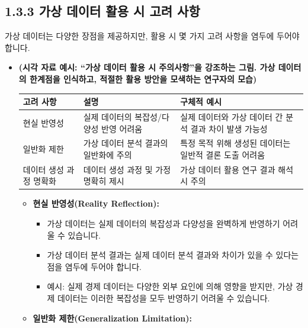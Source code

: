 \documentclass[
  letterpaper,
]{book}
\providecommand{\tightlist}{%
  \setlength{\itemsep}{0pt}\setlength{\parskip}{0pt}}
\begin{document}
\subsection{1.3.3 가상 데이터 활용 시 고려
사항}\label{uxac00uxc0c1-uxb370uxc774uxd130-uxd65cuxc6a9-uxc2dc-uxace0uxb824-uxc0acuxd56d}

가상 데이터는 다양한 장점을 제공하지만, 활용 시 몇 가지 고려 사항을
염두에 두어야 합니다.

\begin{itemize}
\item
  \textbf{(시각 자료 예시: ``가상 데이터 활용 시 주의사항''을 강조하는
  그림. 가상 데이터의 한계점을 인식하고, 적절한 활용 방안을 모색하는
  연구자의 모습)}

  \begin{longtable}[]{@{}
    >{\centering\arraybackslash}p{}
    >{\centering\arraybackslash}p{}
    >{\centering\arraybackslash}p{}@{}}
  \toprule\noalign{}
  \begin{minipage}[b]{\linewidth}\centering
  고려 사항
  \end{minipage} & \begin{minipage}[b]{\linewidth}\centering
  설명
  \end{minipage} & \begin{minipage}[b]{\linewidth}\centering
  구체적 예시
  \end{minipage} \\
  \midrule\noalign{}
  \endhead
  \bottomrule\noalign{}
  \endlastfoot
  현실 반영성 & 실제 데이터의 복잡성/다양성 반영 어려움 & 실제 데이터와
  가상 데이터 간 분석 결과 차이 발생 가능성 \\
  일반화 제한 & 가상 데이터 분석 결과의 일반화에 주의 & 특정 목적 위해
  생성된 데이터는 일반적 결론 도출 어려움 \\
  데이터 생성 과정 명확화 & 데이터 생성 과정 및 가정 명확히 제시 & 가상
  데이터 활용 연구 결과 해석 시 주의 \\
  \end{longtable}

  \begin{itemize}
  \tightlist
  \item
    \textbf{현실 반영성(Reality Reflection):}

    \begin{itemize}
    \tightlist
    \item
      가상 데이터는 실제 데이터의 복잡성과 다양성을 완벽하게 반영하기
      어려울 수 있습니다.
    \item
      가상 데이터 분석 결과는 실제 데이터 분석 결과와 차이가 있을 수
      있다는 점을 염두에 두어야 합니다.
    \item
      예시: 실제 경제 데이터는 다양한 외부 요인에 의해 영향을 받지만,
      가상 경제 데이터는 이러한 복잡성을 모두 반영하기 어려울 수
      있습니다.
    \end{itemize}
  \item
    \textbf{일반화 제한(Generalization Limitation):}


\end{itemize}
\end{itemize}
\end{document}

